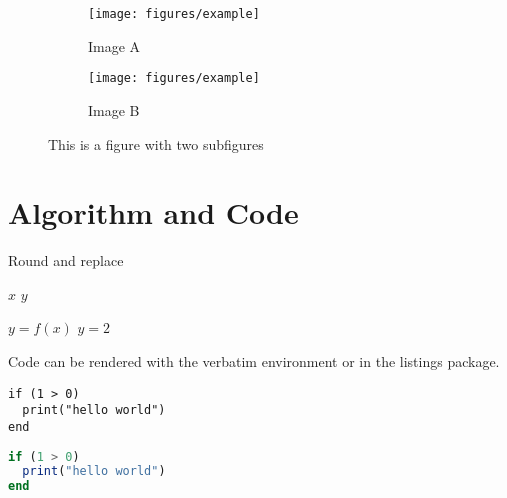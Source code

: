 \begin{figure}
	\begin{subfigure}[h]{0.4\linewidth}
		\texttt{[image: figures/example]}
		\caption{Image A}
	\end{subfigure}
		\hfill
	\begin{subfigure}[h]{0.4\linewidth}
		\texttt{[image: figures/example]}
		\caption{Image B}
	\end{subfigure}%
\caption{This is a figure with two subfigures}
\end{figure}






\section{Algorithm and Code}
\begin{algorithm}[h]
\caption{Round and replace}\label{alg:21}
\begin{algorithmic}[1] %
	\Require $x$
	\Ensure $y$

	\State $y = f(x)$
		\State $y = 2$
	\EndIf

\end{algorithmic}
\end{algorithm}


Code can be rendered with the verbatim environment or in the listings package.

\begin{verbatim}
if (1 > 0)
  print("hello world")
end
\end{verbatim}

\begin{lstlisting}[language=Octave]
if (1 > 0)
  print("hello world")
end
\end{lstlisting}
